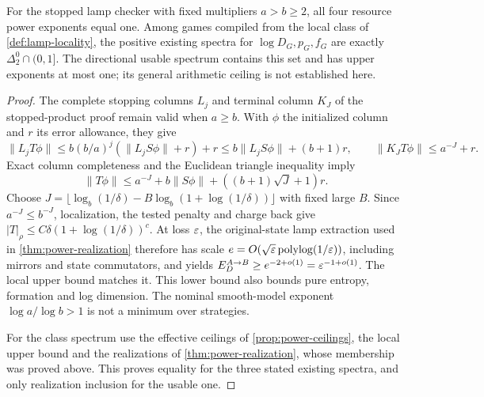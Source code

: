 \begin{corollary}\label{cor:lamp-class-spectrum}
For the stopped lamp checker with fixed multipliers $a>b\ge2$, all four resource power exponents equal one. Among games compiled from the local class of \cref{def:lamp-locality}, the positive existing spectra for $\log D_G,p_G,f_G$ are exactly $\Delta^0_2\cap(0,1]$. The directional usable spectrum contains this set and has upper exponents at most one; its general arithmetic ceiling is not established here.
\end{corollary}
\begin{proof}
The complete stopping columns $L_j$ and terminal column $K_J$ of the stopped-product proof remain valid when $a\ge b$. With $\phi$ the initialized column and $r$ its error allowance, they give
\[
 \|L_jT\phi\|\le b(b/a)^j(\|L_jS\phi\|+r)+r
                 \le b\|L_jS\phi\|+(b+1)r,
 \qquad \|K_JT\phi\|\le a^{-J}+r.
\]
Exact column completeness and the Euclidean triangle inequality imply
\[
 \|T\phi\|\le a^{-J}+b\|S\phi\|+
                   ((b+1)\sqrt J+1)r.
\]
Choose $J=\lfloor\log_b(1/\delta)-B\log_b(1+\log(1/\delta))\rfloor$ with fixed large $B$. Since $a^{-J}\le b^{-J}$, localization, the tested penalty and charge back give $|T|_\rho\le C\delta(1+\log(1/\delta))^c$. At loss $\varepsilon$, the original-state lamp extraction used in \cref{thm:power-realization} therefore has scale $e=O(\sqrt{\varepsilon}\operatorname{polylog}(1/\varepsilon))$, including mirrors and state commutators, and yields $E_D^{A\to B}\ge e^{-2+o(1)}=\varepsilon^{-1+o(1)}$. The local upper bound matches it. This lower bound also bounds pure entropy, formation and log dimension. The nominal smooth-model exponent $\log a/\log b>1$ is not a minimum over strategies.

For the class spectrum use the effective ceilings of \cref{prop:power-ceilings}, the local upper bound and the realizations of \cref{thm:power-realization}, whose membership was proved above. This proves equality for the three stated existing spectra, and only realization inclusion for the usable one.
\end{proof}
